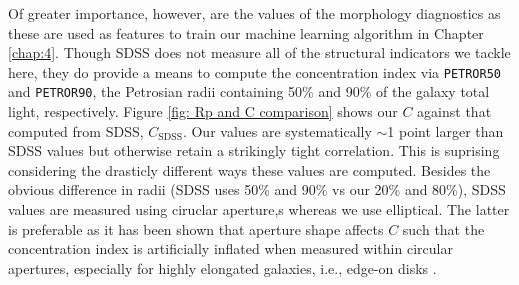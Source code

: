 Of greater importance, however, are the values of the morphology diagnostics as these are used as features to train our machine learning algorithm in Chapter \ref{chap:4}. Though SDSS does not measure all of the structural indicators we tackle here, they do provide a means to compute the concentration index via \texttt{PETROR50} and \texttt{PETROR90}, the Petrosian radii containing 50\% and 90\% of the galaxy total light, respectively. Figure \ref{fig: Rp and C comparison} shows our $C$ against that computed from SDSS, $C_{\mathrm{SDSS}}$. Our values are systematically $\sim$1 point larger than SDSS values but otherwise retain a strikingly tight correlation. This is suprising considering the drasticly different ways these values are computed. Besides the obvious difference in radii (SDSS uses 50\% and 90\% vs our 20\% and 80\%), SDSS values are measured using ciruclar aperture,s whereas we use elliptical. The latter is preferable as it has been shown that aperture shape affects $C$ such that the concentration index is artificially inflated when measured within circular apertures, especially for highly elongated galaxies, i.e., edge-on disks \citep{Bershady2000, Andrae2011}.



